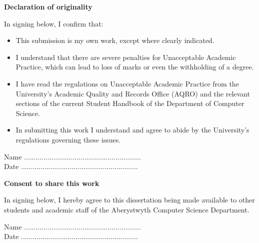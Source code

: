 \thispagestyle{empty}

\begin{center}
    {\LARGE\bf Declaration of originality}
\end{center}

In signing below, I confirm that:

\begin{itemize}
\item{This submission is my own work, except where 
clearly indicated.}

\item{I understand that there are severe penalties for 
Unacceptable Academic Practice, which can lead to loss 
of marks or even the withholding of a degree.}
 
\item{I have read the regulations on Unacceptable Academic 
Practice from the University's Academic Quality and 
Records Office (AQRO) and the relevant sections of the 
current Student Handbook of the Department of 
Computer Science.}
 
\item{In submitting this work I understand and agree to 
abide by the University's regulations governing these issues.}
\end{itemize}

\vspace{2em}
Name ............................................................  \\

\vspace{1em}
Date ............................................................ \\

\vspace{1em}
\begin{center}
    {\LARGE\bf Consent to share this work}
\end{center}

In signing below, I hereby agree to this dissertation being made available to other
students and academic staff of the Aberystwyth Computer Science Department.  

\vspace{2em}
Name ............................................................  \\

\vspace{1em}
Date ............................................................ \\



